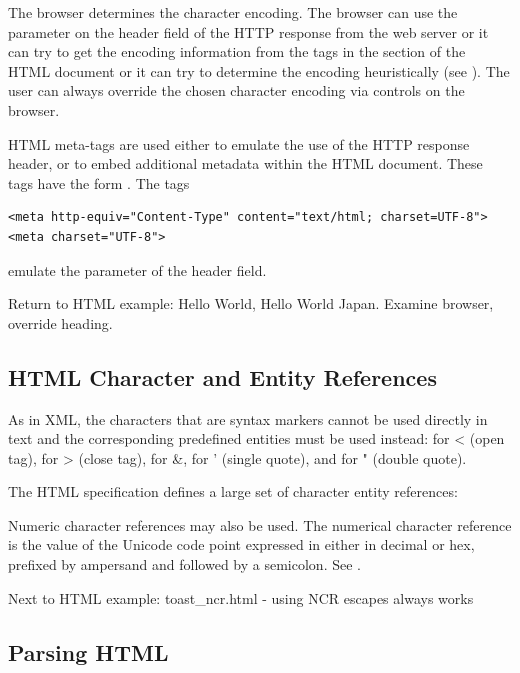 The browser determines the character encoding.
The browser can use the  parameter on the
 header field of the HTTP response
from the web server or it can try to get the encoding information
from the  tags in the  section of the HTML document
or it can try to determine the encoding heuristically
(see ).
The user can always override the chosen character encoding 
via controls on the browser.

HTML meta-tags are used either to emulate the use of the HTTP response header, 
or to embed additional metadata within the HTML document.
These tags have the form .
The tags
\begin{verbatim}
<meta http-equiv="Content-Type" content="text/html; charset=UTF-8">
<meta charset="UTF-8">
\end{verbatim}
emulate the  parameter of the  header field.

Return to HTML example:  Hello World, Hello World Japan. 
Examine browser, override heading.

\subsection{HTML Character and Entity References}

As in XML, the characters that are syntax markers cannot be used directly
in text and the corresponding predefined entities must be used instead:
 for < (open tag),  for > (close tag),  for \&,
 for ' (single quote), and  for " (double quote).

The HTML specification defines a large set of character entity references:

Numeric character references may also be used.
The numerical character reference is the value of the Unicode code point
expressed in either in decimal or hex, 
prefixed by ampersand and followed by a semicolon.
See .

Next to HTML example:  toast_ncr.html - using NCR escapes always works

\subsection{Parsing HTML}

